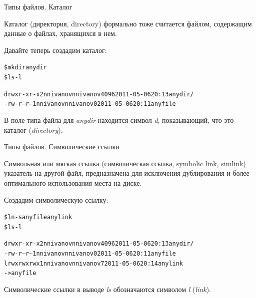 \documentclass[xcolor=table]{beamer}
\begin{document}
\begin{frame}[fragile]{Типы файлов. Каталог}
	\begin{block}{Каталог (директория, directory)}
		формально тоже считается файлом, содержащим данные о файлах, хранящихся в нем.
	\end{block}
	\begin{block}{Давайте теперь создадим каталог:}
		\begin{alltt}
			\$ mkdir anydir
			\$ ls -l

			drwxr-xr-x 2 nnivanov nnivanov 4096 2011-05-06 20:13 anydir/
			-rw-r--r-- 1 nnivanov nnivanov 0 2011-05-06 20:11 anyfile
		\end{alltt}
	\end{block}
	В поле типа файла для \textit{anydir} находится символ \textit{d}, показывающий, что это каталог (\textit{directory}).
\end{frame}

\begin{frame}[fragile]{Типы файлов. Символические ссылки}
	\begin{block}{Символьная или мягкая ссылка (символическая ссылка, symbolic link, simlink)}
		указатель на другой файл, предназначена для исключения дублирования и более оптимального использования места на диске. 
	\end{block}
	\begin{block}{Создадим символическую ссылку:}
		\begin{alltt}
			\$ ln -s anyfile anylink
			\$ ls -l

			drwxr-xr-x 2 nnivanov nnivanov 4096 2011-05-06 20:13 anydir/
			-rw-r--r-- 1 nnivanov nnivanov 0 2011-05-06 20:11 anyfile
			lrwxrwxrwx 1 nnivanov nnivanov 7 2011-05-06 20:14 anylink 
			                                                  -> anyfile
		\end{alltt}
	\end{block}
	Символические ссылки в выводе \textit{ls} обозначаются символом \textit{l} (\textit{link}).
\end{frame}
\end{document}
